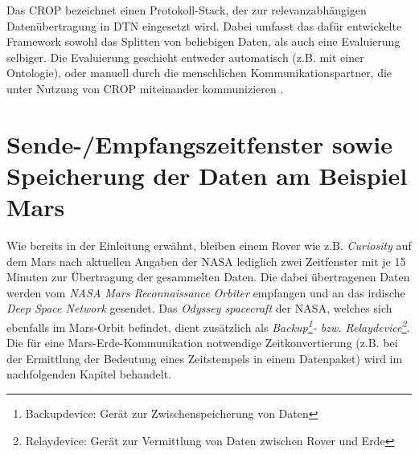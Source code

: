 Das \gls{CROP} bezeichnet einen Protokoll-Stack, der zur relevanzabh{\"a}ngigen
Daten{\"u}bertragung in \gls{DTN} eingesetzt wird. Dabei
umfasst das daf{\"u}r entwickelte Framework sowohl das Splitten von beliebigen
Daten, als auch eine Evaluierung selbiger. Die Evaluierung geschieht entweder
automatisch (z.B. mit einer Ontologie), oder manuell durch die menschlichen
Kommunikationspartner, die unter Nutzung von CROP miteinander kommunizieren
\cite{Daher}.

\section{Sende-/Empfangszeitfenster sowie Speicherung der Daten am Beispiel
Mars}

Wie bereits in der Einleitung erw{\"a}hnt, bleiben einem Rover wie z.B.
\textit{Curiosity} auf dem Mars nach aktuellen Angaben der NASA \cite{web5}
lediglich zwei Zeitfenster mit je 15 Minuten zur {\"U}bertragung der gesammelten
Daten. Die dabei {\"u}bertragenen Daten werden vom \textit{NASA Mars
Reconnaissance Orbiter} empfangen und an das irdische \textit{Deep Space
Network} gesendet. Das \textit{Odyssey spacecraft} der NASA, welches
sich ebenfalls im Mars-Orbit befindet, dient zus{\"a}tzlich als
\textit{Backup\footnote{Backupdevice: Ger{\"a}t zur Zwischenspeicherung von
Daten}- bzw.
Relaydevice\footnote{Relaydevice: Ger{\"a}t zur Vermittlung von Daten zwischen
Rover und Erde}}. Die f{\"u}r eine Mars-Erde-Kommunikation notwendige
Zeitkonvertierung (z.B. bei der Ermittlung der Bedeutung eines Zeitstempels in
einem Datenpaket) wird im nachfolgenden Kapitel behandelt.
\label{Empfangsfenster}